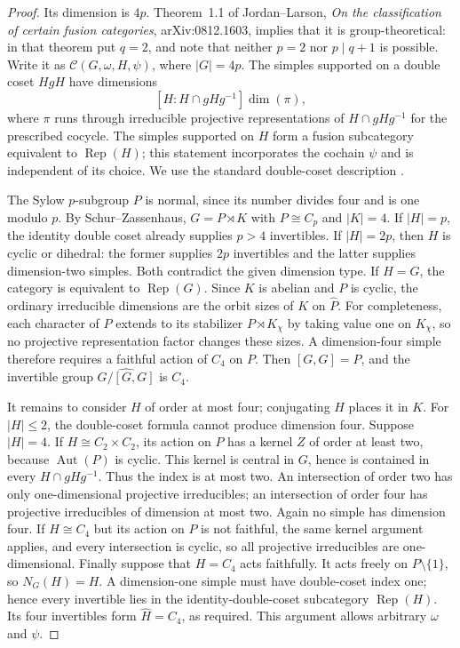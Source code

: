 \begin{proof}
Its dimension is $4p$. Theorem~1.1 of Jordan--Larson,
\emph{On the classification of certain fusion categories},
arXiv:0812.1603, implies that it is group-theoretical: in that theorem
put $q=2$, and note that neither $p=2$ nor $p\mid q+1$ is possible.
Write it as $\mathcal C(G,\omega,H,\psi)$, where $|G|=4p$.
The simples supported on a double coset $HgH$ have dimensions
\[
 [H:H\cap gHg^{-1}]\dim(\pi),
\]
where $\pi$ runs through irreducible projective representations of
$H\cap gHg^{-1}$ for the prescribed cocycle. The simples supported
on $H$ form a fusion subcategory equivalent to $\operatorname{Rep}(H)$;
this statement incorporates the cochain $\psi$ and is independent of
its choice. We use the standard double-coset description
\cite[Theorem~5.1]{GelakiNaidu}.

The Sylow $p$-subgroup $P$ is normal, since its number divides four
and is one modulo $p$. By Schur--Zassenhaus,
$G=P\rtimes K$ with $P\cong C_p$ and $|K|=4$.
If $|H|=p$, the identity double coset already supplies $p>4$
invertibles. If $|H|=2p$, then $H$ is cyclic or dihedral: the former
supplies $2p$ invertibles and the latter supplies dimension-two
simples. Both contradict the given dimension type.
If $H=G$, the category is equivalent to $\operatorname{Rep}(G)$.
Since $K$ is abelian and $P$ is cyclic, the ordinary irreducible
dimensions are the orbit sizes of $K$ on $\widehat P$.
For completeness, each character of $P$ extends to its stabilizer
$P\rtimes K_\chi$ by taking value one on $K_\chi$, so no projective
representation factor changes these sizes. A dimension-four simple
therefore requires a faithful action of $C_4$ on $P$.
Then $[G,G]=P$, and the invertible group
$\widehat{G/[G,G]}$ is $C_4$.

It remains to consider $H$ of order at most four; conjugating $H$
places it in $K$. For $|H|\leq2$, the double-coset formula cannot
produce dimension four. Suppose $|H|=4$.
If $H\cong C_2\times C_2$, its action on $P$ has a kernel $Z$ of
order at least two, because $\operatorname{Aut}(P)$ is cyclic.
This kernel is central in $G$, hence is contained in every
$H\cap gHg^{-1}$. Thus the index is at most two. An intersection of
order two has only one-dimensional projective irreducibles; an
intersection of order four has projective irreducibles of dimension
at most two. Again no simple has dimension four.
If $H\cong C_4$ but its action on $P$ is not faithful, the same kernel
argument applies, and every intersection is cyclic, so all projective
irreducibles are one-dimensional. Finally suppose that $H=C_4$ acts
faithfully. It acts freely on $P\setminus\{1\}$, so
$N_G(H)=H$. A dimension-one simple must have double-coset index one;
hence every invertible lies in the identity-double-coset subcategory
$\operatorname{Rep}(H)$. Its four invertibles form $\widehat H=C_4$,
as required. This argument allows arbitrary $\omega$ and $\psi$.
\end{proof}

